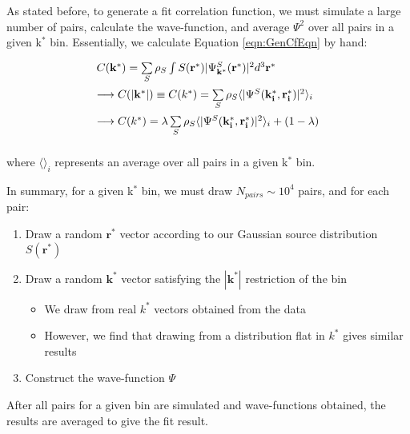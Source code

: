\documentclass[/home/jesse/Analysis/FemtoAnalysis/AnalysisNotes/AnalysisNoteJBuxton.tex]{subfiles}
\begin{document}
As stated before, to generate a fit correlation function, we must simulate a large number of pairs, calculate the wave-function, and average $\Psi^{2}$ over all pairs in a given k$^{*}$ bin.  Essentially, we calculate Equation \ref{eqn:GenCfEqn} by hand:

\begin{equation}
\begin{array}{l}
\vspace{2mm}
  C(\mathbf{k^{*}}) = \sum\limits_{S}\rho_{S}\int S(\mathbf{r^{*}})|\Psi^{S}_{\mathbf{k^{*}}}(\mathbf{r^{*}})|^{2}d^{3}\mathbf{r^{*}} \\
\vspace{2mm}
  \longrightarrow C(|\mathbf{k^{*}}|) \equiv C(k^{*}) = \sum\limits_{S}\rho_{S}\langle |\Psi^{S}(\mathbf{k^{*}_{i}},\mathbf{r^{*}_{i}})|^{2} \rangle_{i} \\
\vspace{2mm}
  \longrightarrow C(k^{*}) = \lambda\sum\limits_{S}\rho_{S}\langle |\Psi^{S}(\mathbf{k^{*}_{i}},\mathbf{r^{*}_{i}})|^{2} \rangle_{i} + (1-\lambda)

\end{array}
\label{eqn:CoulombEqn2}
\end{equation}

where $\langle \rangle_{i}$ represents an average over all pairs in a given k$^{*}$ bin.

In summary, for a given k$^{*}$ bin, we must draw $N_{pairs} \sim 10^{4}$ pairs, and for each pair:

\begin{enumerate}
 \item Draw a random $\mathbf{r}^{*}$ vector according to our Gaussian source distribution $S(\mathbf{r}^{*})$
 \item Draw a random $\mathbf{k}^{*}$ vector satisfying the $|\mathbf{k}^{*}|$ restriction of the bin
 \begin{itemize}
  \item We draw from real $k^{*}$ vectors obtained from the data
  \item However, we find that drawing from a distribution flat in $k^{*}$ gives similar results
 \end{itemize}
 \item Construct the wave-function $\Psi$
\end{enumerate}

After all pairs for a given \kstar bin are simulated and wave-functions obtained, the results are averaged to give the fit result.
\end{document}
